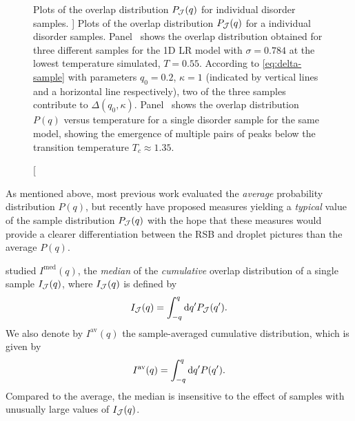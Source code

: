 \begin{figure}
  \centering
  \begin{subfigure}{0.49\textwidth}
    \centering
    
    \subcaption{}\label{fig:sample-overlaps-Tmin}
  \end{subfigure}
  \begin{subfigure}{0.49\textwidth}
    \centering
    
    \subcaption{}\label{fig:sample-overlap}
  \end{subfigure}
  \caption
  [
    Plots of the overlap distribution $P_{\mathcal{J}}(q)$ for individual disorder
    samples.
  ]
  {
    Plots of the overlap distribution $P_{\mathcal{J}}(q)$ for a individual disorder
    samples. Panel~ shows the overlap
    distribution obtained for three different samples for the 1D LR model with
    $\sigma=0.784$ at the lowest temperature simulated, $T=0.55$. According to
    \cref{eq:delta-sample} with parameters $q_0=0.2$, $\kappa=1$ (indicated by
    vertical lines and a horizontal line respectively), two of the three
    samples contribute to $\Delta(q_0,\kappa)$.
    Panel~ shows the overlap distribution $P(q)$
    versus temperature for a single disorder sample for the same model, showing
    the emergence of multiple pairs of peaks below the transition temperature
    $T_c \approx 1.35$.
  }
\end{figure}

As mentioned above, most previous work evaluated the \emph{average} probability
distribution $P(q)$, but recently
\textcite{middleton2013extracting,monthus2013typical}
have proposed measures yielding a \emph{typical} value of the sample
distribution $P_{\mathcal{J}}(q)$ with the hope that these measures would provide a
clearer differentiation between the RSB and droplet pictures than the average
$P(q)$.

\textcite{middleton2013extracting} studied $I^{\mathrm{med}}(q)$, the
\emph{median} of the \emph{cumulative} overlap distribution of a single sample
$I_{\mathcal{J}}(q)$, where $I_{\mathcal{J}}(q)$ is defined by
\begin{equation}
  I_{\mathcal{J}}(q) = \int_{-q}^q \mathop{}\!\mathrm{d} q^{\prime} P_{\mathcal{J}}(q^{\prime}).
\end{equation}
We also denote by $I^{\mathrm{av}}(q)$ the sample-averaged cumulative
distribution, which is given by
\begin{equation}
  I^{\mathrm{av}}(q) = \int_{-q}^q \mathop{}\!\mathrm{d} q^{\prime} P(q^{\prime}).
  \label{eq:Iav}
\end{equation}
Compared to the average, the median is insensitive to the effect of samples
with unusually large values of $I_{\mathcal{J}}(q)$.

